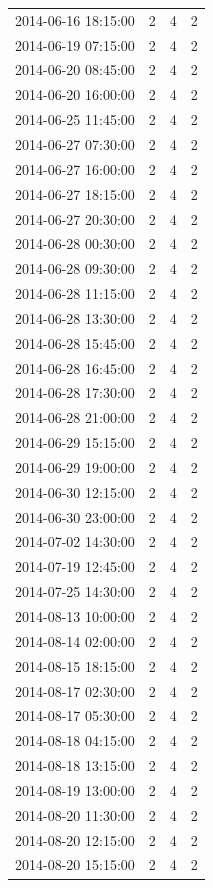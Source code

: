 \begin{tabular}{lrrr}
2014-06-16 18:15:00 & 2 & 4 & 2 \\
2014-06-19 07:15:00 & 2 & 4 & 2 \\
2014-06-20 08:45:00 & 2 & 4 & 2 \\
2014-06-20 16:00:00 & 2 & 4 & 2 \\
2014-06-25 11:45:00 & 2 & 4 & 2 \\
2014-06-27 07:30:00 & 2 & 4 & 2 \\
2014-06-27 16:00:00 & 2 & 4 & 2 \\
2014-06-27 18:15:00 & 2 & 4 & 2 \\
2014-06-27 20:30:00 & 2 & 4 & 2 \\
2014-06-28 00:30:00 & 2 & 4 & 2 \\
2014-06-28 09:30:00 & 2 & 4 & 2 \\
2014-06-28 11:15:00 & 2 & 4 & 2 \\
2014-06-28 13:30:00 & 2 & 4 & 2 \\
2014-06-28 15:45:00 & 2 & 4 & 2 \\
2014-06-28 16:45:00 & 2 & 4 & 2 \\
2014-06-28 17:30:00 & 2 & 4 & 2 \\
2014-06-28 21:00:00 & 2 & 4 & 2 \\
2014-06-29 15:15:00 & 2 & 4 & 2 \\
2014-06-29 19:00:00 & 2 & 4 & 2 \\
2014-06-30 12:15:00 & 2 & 4 & 2 \\
2014-06-30 23:00:00 & 2 & 4 & 2 \\
2014-07-02 14:30:00 & 2 & 4 & 2 \\
2014-07-19 12:45:00 & 2 & 4 & 2 \\
2014-07-25 14:30:00 & 2 & 4 & 2 \\
2014-08-13 10:00:00 & 2 & 4 & 2 \\
2014-08-14 02:00:00 & 2 & 4 & 2 \\
2014-08-15 18:15:00 & 2 & 4 & 2 \\
2014-08-17 02:30:00 & 2 & 4 & 2 \\
2014-08-17 05:30:00 & 2 & 4 & 2 \\
2014-08-18 04:15:00 & 2 & 4 & 2 \\
2014-08-18 13:15:00 & 2 & 4 & 2 \\
2014-08-19 13:00:00 & 2 & 4 & 2 \\
2014-08-20 11:30:00 & 2 & 4 & 2 \\
2014-08-20 12:15:00 & 2 & 4 & 2 \\
2014-08-20 15:15:00 & 2 & 4 & 2 \\

\end{tabular}
